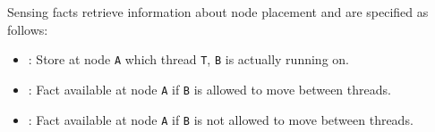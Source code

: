Sensing facts retrieve information about node placement and are specified as
follows:

\begin{itemize}

   \item {}: Store at node \texttt{A} which
      thread \texttt{T}, \texttt{B} is actually running on.

   \item {}: Fact available at node \texttt{A} if
      \texttt{B} is allowed to move between threads.

   \item {}: Fact available at node \texttt{A} if
      \texttt{B} is not allowed to move between threads.

\end{itemize}

